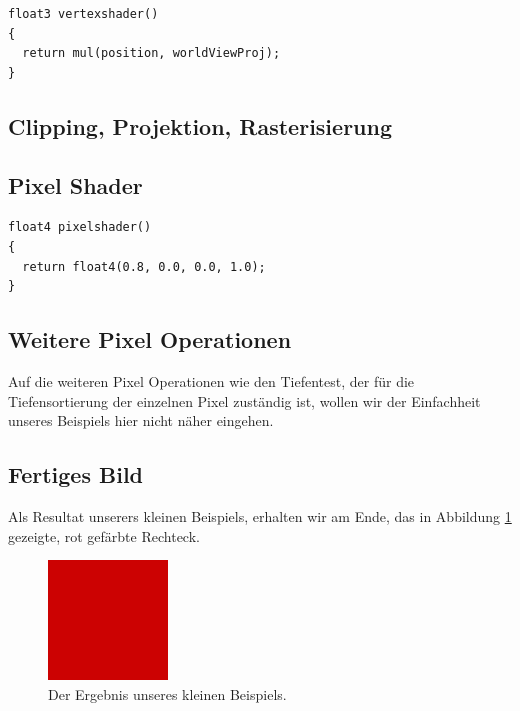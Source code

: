 \begin{Spacing}{\mylinespace}
\begin{lstlisting}[captionpos=b, caption=Vertex Shader unseres Rechtecks, label=vertexshader]
float3 vertexshader()
{
  return mul(position, worldViewProj);		
}
\end{lstlisting}

\subsection{Clipping, Projektion, Rasterisierung}

\subsection{Pixel Shader}

\begin{lstlisting}[captionpos=b, caption=Fragment Shader unseres Rechtecks, label=pixelshader]
float4 pixelshader()
{
  return float4(0.8, 0.0, 0.0, 1.0);
}
\end{lstlisting}

\subsection{Weitere Pixel Operationen}
Auf die weiteren Pixel Operationen wie den Tiefentest, der für die Tiefensortierung der einzelnen Pixel zuständig ist, wollen wir der Einfachheit unseres Beispiels hier nicht näher eingehen.

\subsection{Fertiges Bild}
Als Resultat unserers kleinen Beispiels, erhalten wir am Ende, das in Abbildung \ref{fig:exampleRes} gezeigte, rot gefärbte Rechteck.

\begin{figure}[h!]
	\vspace*{15px}
	\centering
	\includegraphics[height=120px]{graphics/exampleRes.png}	
	\caption{Der Ergebnis unseres kleinen Beispiels.}
	\label{fig:exampleRes}
\end{figure}

\end{Spacing}
\clearpage

